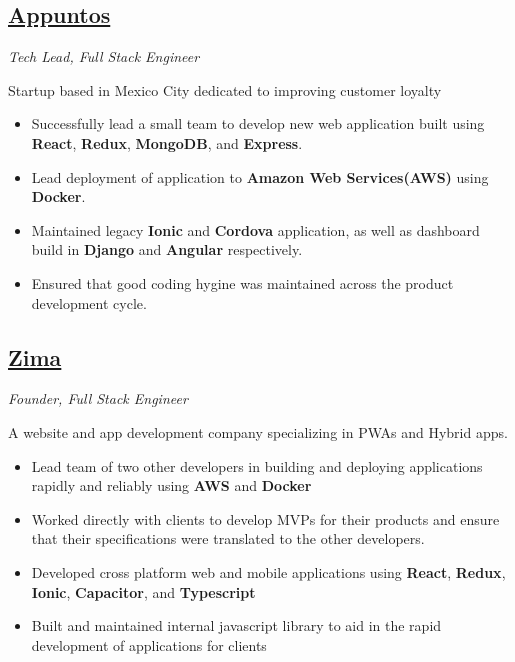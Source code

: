 \documentclass[letterpaper,11pt]{article}
\begin{document}
\subsection{\href{https://www.appuntos.com/}{Appuntos}}
\textit{Tech Lead, Full Stack Engineer}
\vspace{2mm}
\begin{adjustwidth}{1cm}{1cm}
  Startup based in Mexico City dedicated to improving customer loyalty

\begin{itemize}
\item Successfully lead a small team to develop new web application built using \textbf{React}, \textbf{Redux}, \textbf{MongoDB}, and \textbf{Express}.
\item Lead deployment of application to \textbf{Amazon Web Services(AWS)} using \textbf{Docker}.
\item Maintained legacy \textbf{Ionic} and \textbf{Cordova} application, as well as dashboard build in \textbf{Django} and \textbf{Angular} respectively.
\item Ensured that good coding hygine was maintained across the product development cycle.
\end{itemize}

\end{adjustwidth}

\subsection{\href{https://zima.xyz/}{Zima}}
\textit{Founder, Full Stack Engineer}
\vspace{2mm}
\begin{adjustwidth}{1cm}{1cm}
A website and app development company specializing in PWAs and Hybrid apps.

\begin{itemize}
\setlength\itemsep{0em}
\item Lead team of two other developers in building and deploying applications rapidly and reliably using \textbf{AWS} and \textbf{Docker}
\item Worked directly with clients to develop MVPs for their products and ensure that their specifications were translated to the other developers.
\item Developed cross platform web and mobile applications using \textbf{React}, \textbf{Redux}, \textbf{Ionic}, \textbf{Capacitor}, and \textbf{Typescript}
\item Built and maintained internal javascript library to aid in the rapid development of applications for clients
\end{itemize}

\end{adjustwidth}
\end{document}
